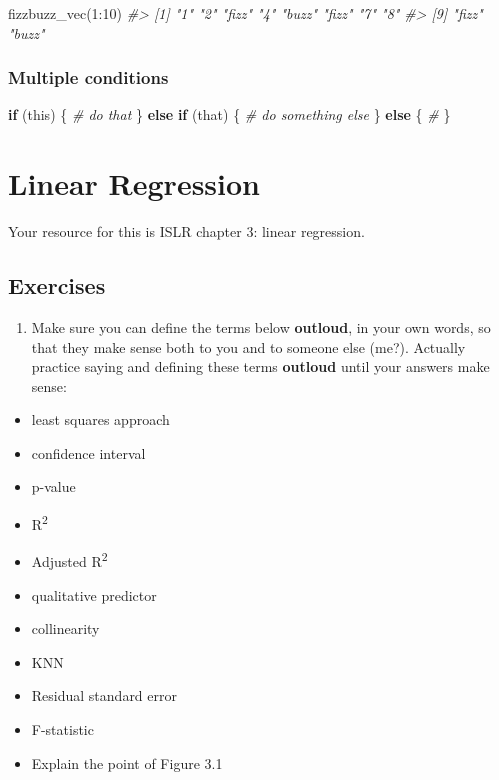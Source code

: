 \documentclass[
]{book}
\newenvironment{Shaded}{\begin{snugshade}}{\end{snugshade}}
\newcommand{\CommentTok}[1]{\textcolor[rgb]{0.56,0.35,0.01}{\textit{#1}}}
\newcommand{\ControlFlowTok}[1]{\textcolor[rgb]{0.13,0.29,0.53}{\textbf{#1}}}
\newcommand{\DecValTok}[1]{\textcolor[rgb]{0.00,0.00,0.81}{#1}}
\newcommand{\FunctionTok}[1]{\textcolor[rgb]{0.00,0.00,0.00}{#1}}
\newcommand{\NormalTok}[1]{#1}
\newcommand{\SpecialCharTok}[1]{\textcolor[rgb]{0.00,0.00,0.00}{#1}}
\providecommand{\tightlist}{%
  \setlength{\itemsep}{0pt}\setlength{\parskip}{0pt}}
\begin{document}
\begin{Shaded}
\begin{Highlighting}[]
\FunctionTok{fizzbuzz\_vec}\NormalTok{(}\DecValTok{1}\SpecialCharTok{:}\DecValTok{10}\NormalTok{)}
\CommentTok{\#\textgreater{}  [1] "1"    "2"    "fizz" "4"    "buzz" "fizz" "7"    "8"   }
\CommentTok{\#\textgreater{}  [9] "fizz" "buzz"}
\end{Highlighting}
\end{Shaded}

\hypertarget{multiple-conditions}{%
\subsection{Multiple conditions}\label{multiple-conditions}}

\begin{Shaded}
\begin{Highlighting}[]
\ControlFlowTok{if}\NormalTok{ (this) \{}
  \CommentTok{\# do that}
\NormalTok{\} }\ControlFlowTok{else} \ControlFlowTok{if}\NormalTok{ (that) \{}
  \CommentTok{\# do something else}
\NormalTok{\} }\ControlFlowTok{else}\NormalTok{ \{}
  \CommentTok{\# }
\NormalTok{\}}
\end{Highlighting}
\end{Shaded}

\hypertarget{linear-regression}{%
\chapter{Linear Regression}\label{linear-regression}}

Your resource for this is ISLR chapter 3: linear regression.

\hypertarget{exercises}{%
\section{Exercises}\label{exercises}}

\begin{enumerate}
\def\labelenumi{\arabic{enumi}.}
\tightlist
\item
  Make sure you can define the terms below \textbf{outloud}, in your own words, so that they make sense both to you and to someone else (me?). Actually practice saying and defining these terms \textbf{outloud} until your answers make sense:
\end{enumerate}

\begin{itemize}
\tightlist
\item
  least squares approach
\item
  confidence interval
\item
  p-value
\item
  R\textsuperscript{2}
\item
  Adjusted R\textsuperscript{2}
\item
  qualitative predictor
\item
  collinearity
\item
  KNN
\item
  Residual standard error
\item
  F-statistic
\item
  Explain the point of Figure 3.1
\end{itemize}
\end{document}
